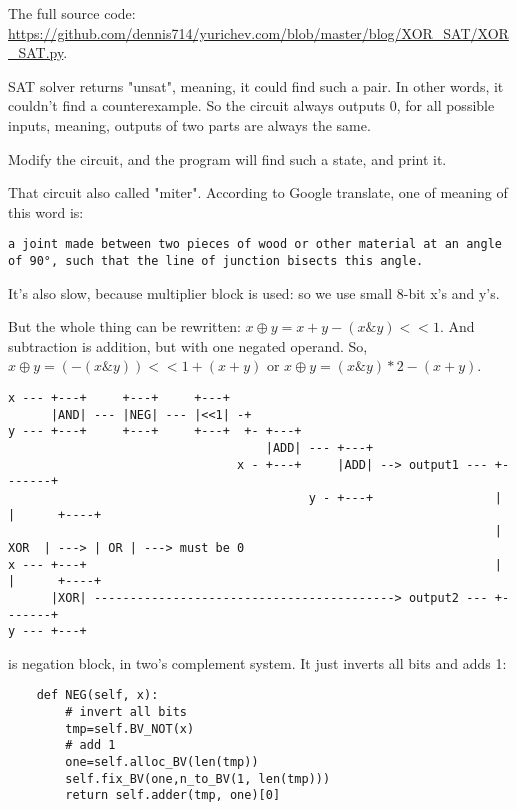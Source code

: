 The full source code: \url{https://github.com/dennis714/yurichev.com/blob/master/blog/XOR_SAT/XOR_SAT.py}.

SAT solver returns "unsat", meaning, it could find such a pair.
In other words, it couldn't find a counterexample.
So the circuit always outputs 0, for all possible inputs, meaning, outputs of two parts are always the same.

Modify the circuit, and the program will find such a state, and print it.

That circuit also called "miter".
According to Google translate, one of meaning of this word is:

\begin{lstlisting}
a joint made between two pieces of wood or other material at an angle of 90°, such that the line of junction bisects this angle.
\end{lstlisting}

It's also slow, because multiplier block is used: so we use small 8-bit x's and y's.

But the whole thing can be rewritten: $x \oplus y = x+y - (x \& y)<<1$.
And subtraction is addition, but with one negated operand.
So, $x \oplus y = (-(x \& y))<<1 + (x + y)$ or
$x \oplus y = (x \& y)*2 - (x + y)$.

\begin{lstlisting}
x --- +---+     +---+     +---+
      |AND| --- |NEG| --- |<<1| -+ 
y --- +---+     +---+     +---+  +- +---+
                                    |ADD| --- +---+
                                x - +---+     |ADD| --> output1 --- +-------+
                                          y - +---+                 |       |      +----+
                                                                    |  XOR  | ---> | OR | ---> must be 0
x --- +---+                                                         |       |      +----+
      |XOR| ------------------------------------------> output2 --- +-------+
y --- +---+
\end{lstlisting}

 is negation block, in two's complement system.
It just inverts all bits and adds 1:

\begin{lstlisting}
    def NEG(self, x):
        # invert all bits
        tmp=self.BV_NOT(x)
        # add 1
        one=self.alloc_BV(len(tmp))
        self.fix_BV(one,n_to_BV(1, len(tmp)))
        return self.adder(tmp, one)[0]
\end{lstlisting}

